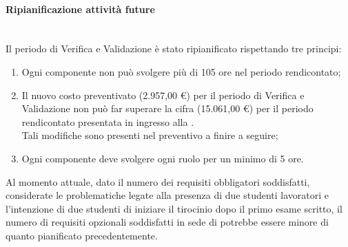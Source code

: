 \paragraph{Ripianificazione attività future} \mbox{}\\
Il periodo di Verifica e Validazione è stato ripianificato rispettando tre principi:
\begin{enumerate}
\item Ogni componente non può svolgere più di 105 ore nel periodo rendicontato;
\item Il nuovo costo preventivato (2.957,00 \euro) per il periodo di Verifica e Validazione non può far superare la cifra (15.061,00 \euro) per il periodo rendicontato presentata in ingresso alla \RR{}. \\Tali modifiche sono presenti nel preventivo a finire a seguire;
\item Ogni componente deve svolgere ogni ruolo per un minimo di 5 ore.
\end{enumerate}

Al momento attuale, dato il numero dei requisiti obbligatori soddisfatti, considerate le problematiche legate alla presenza di due studenti lavoratori e l'intenzione di due studenti di iniziare il tirocinio dopo il primo esame scritto, il numero di requisiti opzionali soddisfatti in sede di \RA{} potrebbe essere minore di quanto pianificato precedentemente.